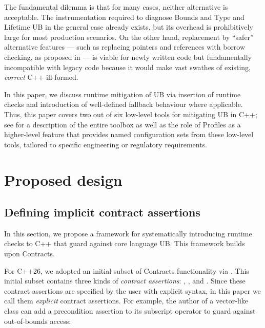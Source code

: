 The fundamental dilemma is that for many cases, neither alternative is acceptable. The instrumentation required to diagnose Bounds and Type and Lifetime UB in the general case already exists, but its overhead is prohibitively large for most production scenarios. On the other hand, replacement by ``safer'' alternative features --- such as replacing pointers and references with borrow checking, as proposed in \cite{P3390R0} --- is viable for newly written code but fundamentally incompatible with legacy code because it would make vast swathes of existing, \emph{correct} C++ ill-formed.

In this paper, we discuss runtime mitigation of UB via insertion of runtime checks and introduction of well-defined fallback behaviour where applicable. Thus, this paper covers two out of six low-level tools for mitigating UB in C++; see \cite{P3756R0} %
for a description of the entire toolbox as well as the role of Profiles as a higher-level feature that provides named configuration sets from these low-level tools, tailored to specific engineering or regulatory requirements.


\section{Proposed design}
\label{design}

\subsection{Defining implicit contract assertions}
\label{defineicas}

In this section, we propose a framework for systematically introducing runtime checks to C++ that guard against core language UB. This framework builds upon Contracts.

For C++26, we adopted an initial subset of Contracts functionality via \cite{P2900R14}. This initial subset contains three kinds of \emph{contract assertions}: , , and . Since these contract assertions are specified by the user with explicit syntax, in this paper we call them \emph{explicit} contract assertions. For example, the author of a vector-like class can add a precondition assertion to its subscript operator to guard against out-of-bounds access:

